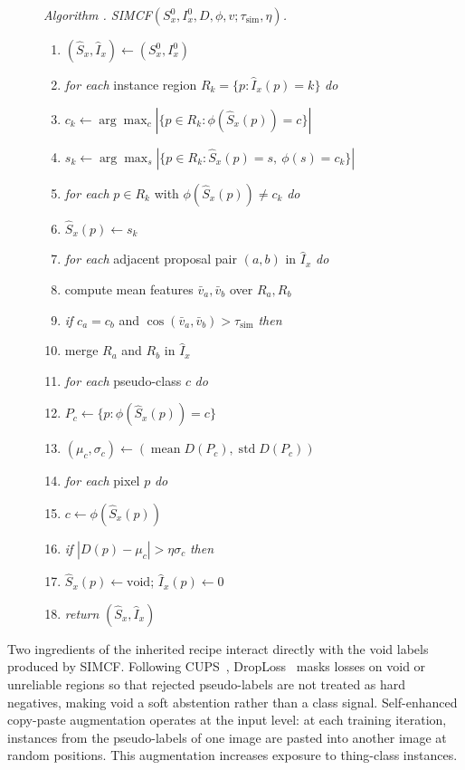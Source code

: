 \documentclass[10pt,twocolumn,letterpaper]{article}
\newcounter{algorithm}
\newenvironment{cvpralgorithm}{\begin{figure}[t]\refstepcounter{algorithm}\noindent\begin{minipage}{\linewidth}}{\end{minipage}\end{figure}}
\newcommand{\algorithmcaption}[1]{\noindent\emph{Algorithm \thealgorithm. #1}\par\vspace{2pt}}
\newcommand{\algkw}[1]{\emph{#1}}
\newcommand{\algindent}{\hspace*{1.2em}}
\newcommand{\algindenttwo}{\hspace*{2.4em}}
\begin{document}
\begin{cvpralgorithm}
\algorithmcaption{SIMCF$(S_x^0,I_x^0,D,\phi,v;\tau_\text{sim},\eta)$.}
\label{alg:simcf}
\begin{enumerate}
\setlength{\itemsep}{0pt}
\setlength{\topsep}{2pt}
\item $(\hat S_x,\hat I_x) \gets (S_x^0,I_x^0)$
\item \algkw{for each} instance region $R_k=\{p:\hat I_x(p)=k\}$ \algkw{do}
\item \algindent $c_k \gets \arg\max_c |\{p\in R_k:\phi(\hat S_x(p))=c\}|$
\item \algindent $s_k \gets \arg\max_s |\{p\in R_k:\hat S_x(p)=s,\ \phi(s)=c_k\}|$
\item \algindent \algkw{for each} $p\in R_k$ with $\phi(\hat S_x(p))\ne c_k$ \algkw{do}
\item \algindenttwo $\hat S_x(p)\gets s_k$
\item \algkw{for each} adjacent proposal pair $(a,b)$ in $\hat I_x$ \algkw{do}
\item \algindent compute mean features $\bar v_a,\bar v_b$ over $R_a,R_b$
\item \algindent \algkw{if} $c_a=c_b$ and $\cos(\bar v_a,\bar v_b)>\tau_\text{sim}$ \algkw{then}
\item \algindenttwo merge $R_a$ and $R_b$ in $\hat I_x$
\item \algkw{for each} pseudo-class $c$ \algkw{do}
\item \algindent $P_c\gets\{p:\phi(\hat S_x(p))=c\}$
\item \algindent $(\mu_c,\sigma_c)\gets(\operatorname{mean}D(P_c),\operatorname{std}D(P_c))$
\item \algkw{for each} pixel $p$ \algkw{do}
\item \algindent $c\gets\phi(\hat S_x(p))$
\item \algindent \algkw{if} $|D(p)-\mu_c|>\eta\sigma_c$ \algkw{then}
\item \algindenttwo $\hat S_x(p)\gets\mathrm{void}$; \quad $\hat I_x(p)\gets0$
\item \algkw{return} $(\hat S_x,\hat I_x)$
\end{enumerate}
\end{cvpralgorithm}

Two ingredients of the inherited recipe interact directly with the void labels produced by SIMCF. Following CUPS~\cite{hahn2025cups}, DropLoss~\cite{wang2023cutler} masks losses on void or unreliable regions so that rejected pseudo-labels are not treated as hard negatives, making void a soft abstention rather than a class signal. Self-enhanced copy-paste augmentation operates at the input level: at each training iteration, instances from the pseudo-labels of one image are pasted into another image at random positions. This augmentation increases exposure to thing-class instances.
\end{document}
